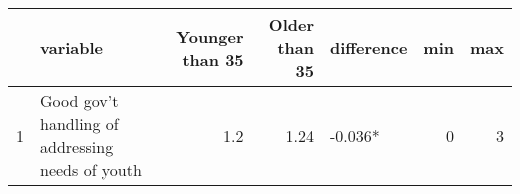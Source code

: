 \begingroup\fontsize{15}{17}\selectfont

\begin{tabular}{l|l|r|r|l|r|r}
\hline
  & variable & Younger than 35 & Older than 35 & difference & min & max\\
\hline
1 & Good gov't handling of addressing needs of youth & 1.2 & 1.24 & -0.036* & 0 & 3\\
\hline
\end{tabular}
\endgroup{}
